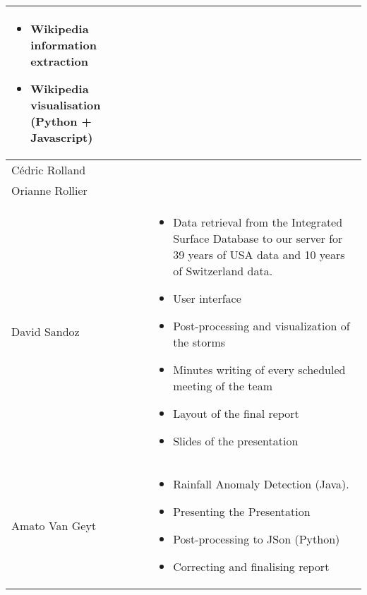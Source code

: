 \begin{tabular}{|l|p{10.5cm}|}
\begin{itemize}
	\item Wikipedia information extraction
	\item Wikipedia visualisation (Python + Javascript)
\end{itemize}\\
\hline
Cédric Rolland &  \\
\hline
Orianne Rollier & \\
\hline
David Sandoz &
\begin{itemize}
	\item Data retrieval from the Integrated Surface Database to our server for 39 years of USA data and 10 years of Switzerland data.
	\item User interface
	\item Post-processing and visualization of the storms
	\item Minutes writing of every scheduled meeting of the team
	\item Layout of the final report
	\item Slides of the presentation
\end{itemize}\\
\hline
Amato Van Geyt & \begin{itemize}
	\item Rainfall Anomaly Detection (Java).
	\item Presenting the Presentation
	\item Post-processing to JSon (Python)
	\item Correcting and finalising report
\end{itemize}\\ 
\hline
\end{tabular}
